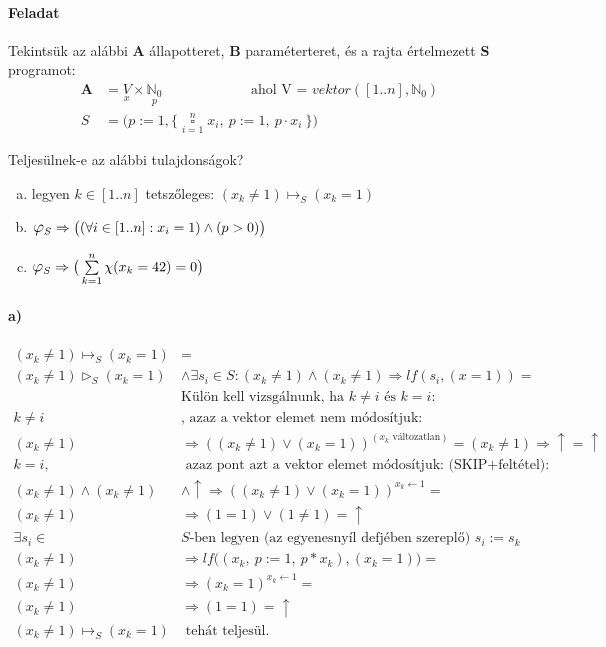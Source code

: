 \documentclass[12pt]{article}
\newcommand{\haromszog}[2]{\ensuremath{#1 \vartriangleright_S #2}}
\newcommand{\egyenesnyil}[2]{\ensuremath{#1 \mapsto_S #2}}
\newcommand{\doboz}[2]{ \ensuremath{\mathop{\square}\limits_{#1=1}^{#2} }  }
\newcommand{\fixpont}{\ensuremath{\mathlarger{\mathlarger{\varphi}}_S}}
\begin{document}
	\paragraph{Feladat}
	Tekintsük az alábbi \textbf{A} állapotteret, \textbf{B} paraméterteret, és a rajta értelmezett \textbf{S} programot:
	\begin{align*}
	\textbf{A} &= \underset{x}{V} \times \underset{p}{\mathbb{N}_0} \qquad \qquad \qquad \text{ ahol V = } vektor([1..n], \mathbb{N}_0)\\
	S &= \Big(p := 1, \{\doboz{i}{n} x_i,\ p :=1,\ p\cdot x_i\ \}\Big)
	\end{align*}
	
	Teljesülnek-e az alábbi tulajdonságok?
	\begin{enumerate}[a)]
		\item legyen $k \in [1..n]$ tetszőleges: $\egyenesnyil{(x_k \ne 1)}{(x_k = 1)}$
		\item $ \fixpont \Rightarrow \big( (\forall i \in [1..n]: x_i = 1) \land (p>0)\big) $
		\item $\fixpont \Rightarrow \big(\sum\limits_{k=1}^{n}\chi(x_k=42) = 0\big)$
	\end{enumerate}
	
	\paragraph{a)}
	\paragraph{}
	$
	\begin{aligned}
	\egyenesnyil{(x_k\ne 1)}{(x_k=1)} &=\\
	\haromszog{(x_k\ne 1)}{(x_k=1)} &\land \exists s_i\in S: (x_k\ne 1) \land (x_k\ne 1) \Rightarrow lf(s_i, (x=1)) = \\
	&\text{Külön kell vizsgálnunk, ha } k\ne i \text{ és } k = i:\\
	k \ne i &\text{, azaz a vektor elemet nem módosítjuk:}\\
	(x_k \ne 1) &\Rightarrow ((x_k \ne 1) \lor (x_k = 1))^{(x_k \text{ változatlan})} = (x_k \ne 1) \Rightarrow \uparrow = \uparrow \\
	k=i, &\text{ azaz pont azt a vektor elemet módosítjuk: (SKIP+feltétel):}\\
	(x_k \ne 1) \land (x_k \ne 1) &\land \uparrow \Rightarrow ((x_k \ne 1) \lor (x_k = 1))^{x_k \leftarrow 1} = \\
	(x_k \ne 1) &\Rightarrow (1=1) \lor (1\ne 1) = \uparrow \\
	\exists s_i \in &S \text{-ben legyen (az egyenesnyíl defjében szereplő) } s_i := s_k \\
	(x_k \ne 1) &\Rightarrow lf\big((x_k,\ p := 1,\ p*x_k), (x_k = 1)\big) =\\
	(x_k \ne 1) &\Rightarrow (x_k = 1)^{x_k \leftarrow 1} =\\
	(x_k \ne 1) &\Rightarrow (1=1) = \uparrow \\
	\egyenesnyil{(x_k\ne 1)}{(x_k=1)} &\text{ tehát teljesül.}
	\end{aligned}
	$
	
\end{document}
